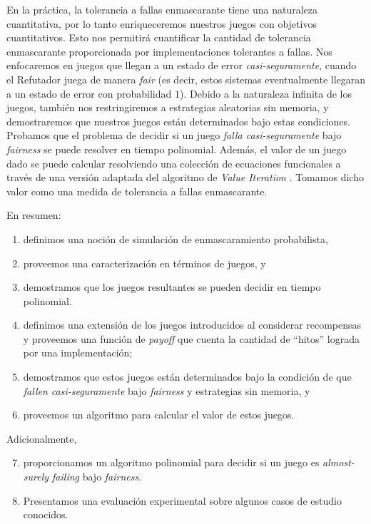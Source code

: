 En la práctica, la tolerancia a fallas enmascarante tiene una naturaleza cuantitativa, por lo tanto enriqueceremos nuestros juegos con objetivos cuantitativos. Esto nos permitirá cuantificar la
cantidad de tolerancia enmascarante proporcionada por implementaciones tolerantes a fallas.
%
Nos enfocaremos en juegos que llegan a un estado de error \textit{casi-seguramente}, cuando el Refutador juega
de manera \textit{fair} (es decir, estos sistemas eventualmente llegaran a un estado de error con probabilidad $1$). Debido a la naturaleza infinita de los juegos, también nos restringiremos a estrategias aleatorias sin memoria, y demostraremos que nuestros juegos están
determinados bajo estas condiciones.
%
Probamos que el problema de decidir si un juego \textit{falla casi-seguramente} bajo \textit{fairness} se puede resolver en tiempo polinomial. Además, el valor de un juego dado se puede calcular
resolviendo una colección de ecuaciones funcionales a través de una versión adaptada del algoritmo de \emph{Value Iteration} \cite{ChatterjeeH08,Condon90,Condon92,KelmendiKKW18}. Tomamos dicho valor como una medida de tolerancia a fallas enmascarante.

En resumen:
\begin{enumerate}
\item%
  definimos una noción de simulación de enmascaramiento probabilista,
\item%
  proveemos una caracterización en términos de juegos, y
\item%
  demostramos que los juegos resultantes se pueden decidir en tiempo polinomial.
\item%
  definimos una extensión de los juegos introducidos al considerar recompensas y proveemos una función de \textit{payoff} que cuenta la cantidad de ``hitos'' lograda por una implementación;
\item%
  demostramos que estos juegos están determinados bajo la condición de que \textit{fallen casi-seguramente} bajo \textit{fairness} y estrategias sin memoria, y
\item%
  proveemos un algoritmo para calcular el valor de estos juegos.
\end{enumerate}

Adicionalmente,
\begin{enumerate}\setcounter{enumi}{6}
\item%
  proporcionamos un algoritmo polinomial para decidir si un juego es \textit{almost-surely failing} bajo \textit{fairness}.
%
\item%
  Presentamos una evaluación experimental sobre algunos casos de estudio conocidos.
\end{enumerate}
%
